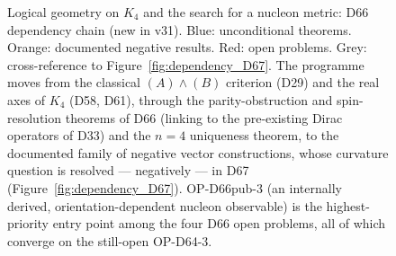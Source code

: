 \documentclass[11pt,a4paper]{article}
\theoremstyle{plain}
\theoremstyle{definition}
\theoremstyle{remark}
\begin{document}
\begin{figure}[H]
{%
}
\caption{Logical geometry on $K_4$ and the search for a nucleon metric: D66 dependency chain (new in v31). \textcolor{proofblue}{Blue}: unconditional theorems. Orange: documented negative results. \textcolor{openproblemred}{Red}: open problems. Grey: cross-reference to Figure~\ref{fig:dependency_D67}. The programme moves from the classical $(A)\wedge(B)$ criterion (D29) and the real axes of $K_4$ (D58, D61), through the parity-obstruction and spin-resolution theorems of D66 (linking to the pre-existing Dirac operators of D33) and the $n=4$ uniqueness theorem, to the documented family of negative vector constructions, whose curvature question is resolved --- negatively --- in D67 (Figure~\ref{fig:dependency_D67}). OP-D66pub-3 (an internally derived, orientation-dependent nucleon observable) is the highest-priority entry point among the four D66 open problems, all of which converge on the still-open OP-D64-3.}
\label{fig:dependency_D66}
\end{figure}
\end{document}
